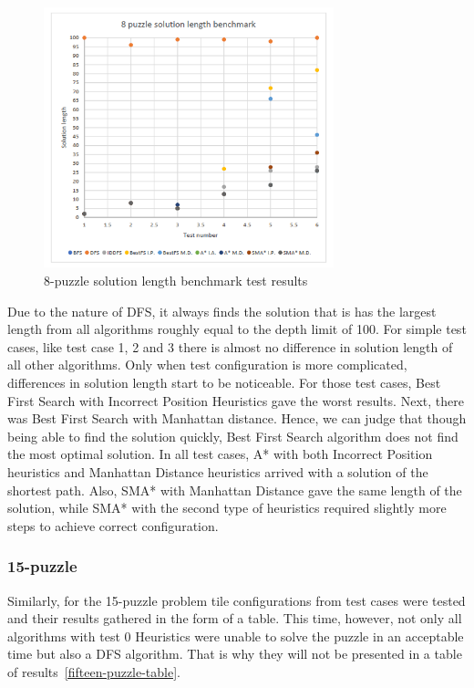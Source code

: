 \documentclass[12pt]{article}
\begin{document}
 \begin{figure}[h]
    \includegraphics[width=0.75\textwidth]{8_puzzle_length}
    \centering
    \caption{8-puzzle solution length benchmark test results}
\label {eight-puzzle-plot-length}
\end{figure}

Due to the nature of DFS, it always finds the solution that is has the largest length from all algorithms roughly equal to the depth limit of 100. For simple test cases, like test case 1, 2 and 3 there is almost no difference in solution length of all other algorithms. Only when test configuration is more complicated, differences in solution length start to be noticeable. For those test cases, Best First Search with Incorrect Position Heuristics gave the worst results. Next, there was Best First Search with Manhattan distance. Hence, we can judge that though being able to find the solution quickly, Best First Search algorithm does not find the most optimal solution. In all test cases, A* with both Incorrect Position heuristics and Manhattan Distance heuristics arrived with a solution of the shortest path. Also, SMA* with Manhattan Distance gave the same length of the solution, while SMA* with the second type of heuristics required slightly more steps to achieve correct configuration.

\newpage
\subsubsection {15-puzzle}

Similarly, for the 15-puzzle problem tile configurations from test cases were tested and their results gathered in the form of a table. This time, however, not only all algorithms with test 0 Heuristics were unable to solve the puzzle in an acceptable time but also a DFS algorithm. That is why they will not be presented in a table of results~\ref{fifteen-puzzle-table}.
\end{document}
